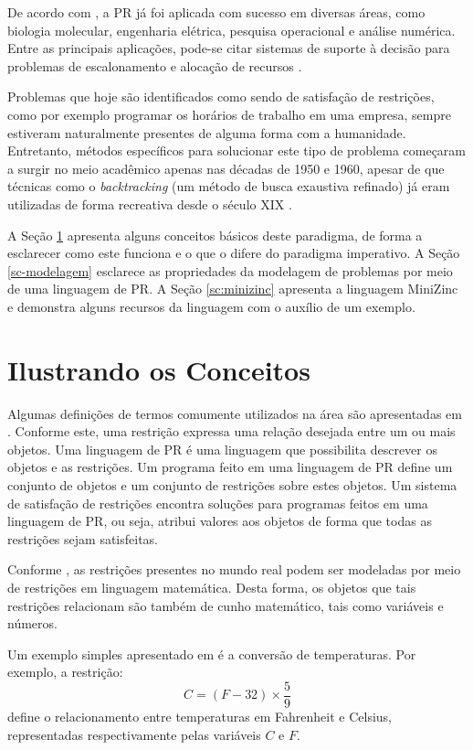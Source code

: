 De acordo com \cite{apt}, a PR já foi aplicada com sucesso em diversas áreas, como biologia molecular, engenharia elétrica, pesquisa operacional e análise numérica. Entre as principais aplicações, pode-se citar sistemas de suporte à decisão para problemas de escalonamento e alocação de recursos \cite{thom}.

Problemas que hoje são identificados como sendo de satisfação de restrições, como por exemplo programar os horários de trabalho em uma empresa, sempre estiveram naturalmente presentes de alguma forma com a humanidade. Entretanto, métodos específicos para solucionar este tipo de problema começaram a surgir no meio acadêmico apenas nas décadas de 1950 e 1960, apesar de que técnicas como o \textit{backtracking} (um método de busca exaustiva refinado) já eram utilizadas de forma recreativa desde o século XIX \cite{cphandbook}.

A Seção \ref{sc-conceitos-basicos-pr} apresenta alguns conceitos básicos deste paradigma, de forma a esclarecer como este funciona e o que o difere do paradigma imperativo. A Seção \ref{sc-modelagem} esclarece as propriedades da modelagem de problemas por meio de uma linguagem de PR. A Seção \ref{sc:minizinc} apresenta a linguagem MiniZinc e demonstra alguns recursos da linguagem com o auxílio de um exemplo.



\section{Ilustrando os Conceitos}
\label{sc-conceitos-basicos-pr}

Algumas definições de termos comumente utilizados na área são apresentadas em \cite{leler}. Conforme este, uma restrição expressa uma relação desejada entre um ou mais objetos. Uma linguagem de PR é uma linguagem que possibilita descrever os objetos e as restrições. Um programa feito em uma linguagem de PR define um conjunto de objetos e um conjunto de restrições sobre estes objetos. Um sistema de satisfação de restrições encontra soluções para programas feitos em uma linguagem de PR, ou seja, atribui valores aos objetos de forma que todas as restrições sejam satisfeitas.

Conforme \cite{stuckey}, as restrições presentes no mundo real podem ser modeladas por meio de restrições em linguagem matemática. Desta forma, os objetos que tais restrições relacionam são também de cunho matemático, tais como variáveis e números.

Um exemplo simples apresentado em \cite{leler} é a conversão de temperaturas. Por exemplo, a restrição:
\[
  C = (F - 32) \times \frac{5}{9}
\]
define o relacionamento entre temperaturas em Fahrenheit e Celsius, representadas respectivamente pelas variáveis $C$ e $F$.

